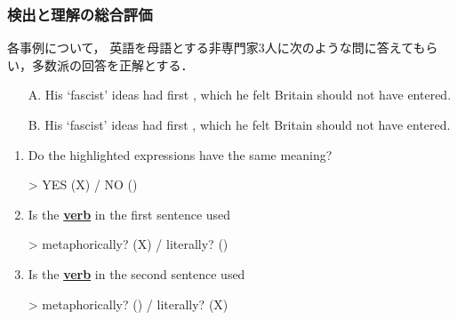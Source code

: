 \documentclass[11pt]{beamer}
\newlength{\la}
\newlength{\lb}
\newcommand\marker[1]{\colorbox{sYellow}{#1}}
\newcommand\bluemarker[1]{\colorbox{sLightBlue}{#1}}
\begin{document}
\begingroup
\footnotesize
\begin{frame}
\frametitle{検出と理解の総合評価}
各事例について，
英語を母語とする非専門家3人に次のような問に答えてもらい，多数派の回答を正解とする．

\begin{itemize}
    \item[A.] His `fascist' \marker{ideas had} first
,
which he felt Britain should not have entered.

    \item[B.] His `fascist' \bluemarker{ideas had} first
,
which he felt Britain should not have entered.
\end{itemize}

\begin{enumerate}
\item\label{q1} Do the highlighted expressions have the same meaning?

    \textcolor{sBrown}{> YES (X) / NO (\phantom{X})}
\item\label{q2} Is the \underline{\textbf{verb}} in the first sentence used

    \textcolor{sBrown}{> metaphorically? (X) / literally? (\phantom{X})}
\item\label{q3} Is the \underline{\textbf{verb}} in the second sentence used

    \textcolor{sBrown}{> metaphorically? (\phantom{X}) / literally? (X)}
\end{enumerate}
\end{frame}
\endgroup
\end{document}
